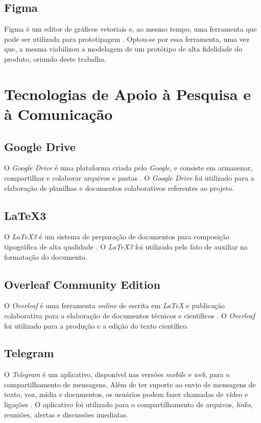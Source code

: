 \subsection{Figma}
Figma é um editor de gráficos vetoriais e, ao mesmo tempo, uma ferramenta que pode ser utilizada para prototipagem \cite{figma}. Optou-se por essa ferramenta, uma vez que, a mesma viabilizou a modelagem de um protótipo de alta fidelidade do produto, oriundo deste trabalho.

\section{Tecnologias de Apoio à Pesquisa e à Comunicação}

\label{tec_apoio_pesquisa_comunicacao}

\subsection{Google Drive}
O \textit{Google Drive} é uma plataforma criada pelo \textit{Google}, e consiste em armazenar, compartilhar e colaborar arquivos e pastas \cite{drive}. O \textit{Google Drive} foi utilizado para a elaboração de planilhas e documentos colaborativos referentes ao projeto.

\subsection{LaTeX3}
O \textit{LaTeX3} é um sistema de preparação de documentos para composição tipográfica de alta qualidade \cite{latex}. O \textit{LaTeX3} foi utilizado pelo fato de auxiliar na formatação do documento.

\subsection{Overleaf Community Edition}
O \textit{Overleaf} é uma ferramenta \textit{online} de escrita em \textit{LaTeX} e publicação colaborativa para a elaboração de documentos técnicos e científicos \cite{overleaf}. O \textit{Overleaf} foi utilizado para a produção e a edição do texto científico.

\subsection{Telegram}
O \textit{Telegram} é um aplicativo, disponível nas versões \textit{mobile} e \textit{web}, para o compartilhamento de mensagens. Além de ter suporte ao envio de mensagens de texto, voz, mídia e documentos, os usuários podem fazer chamadas de vídeo e ligações \cite{telegram}. O aplicativo foi utilizado para o compartilhamento de arquivos, \textit{links}, reuniões, alertas e discussões imediatas.


